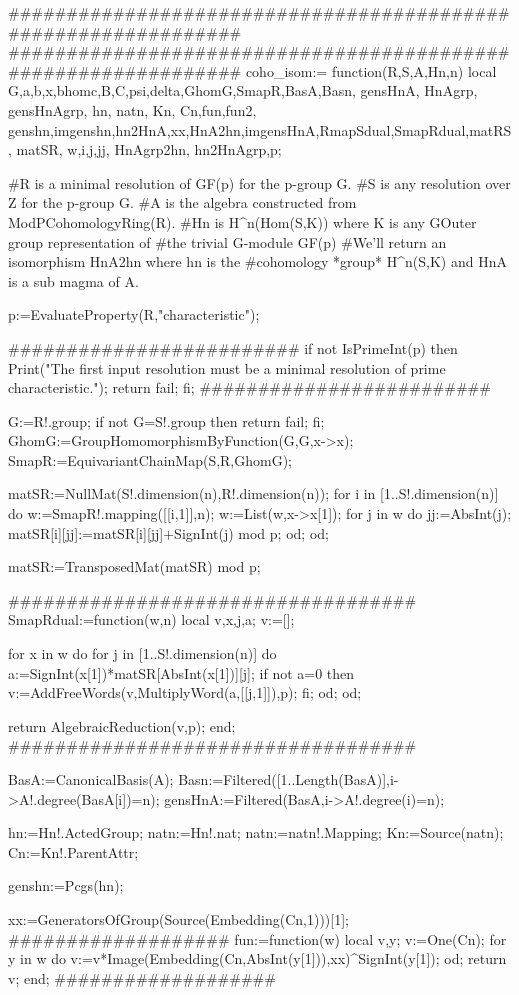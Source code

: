 ###############################################################
###############################################################
coho_isom:=
function(R,S,A,Hn,n)
local G,a,b,x,bhomc,B,C,psi,delta,GhomG,SmapR,BasA,Basn,
      gensHnA, HnAgrp, gensHnAgrp, hn, natn, Kn, Cn,fun,fun2,
      genshn,imgenshn,hn2HnA,xx,HnA2hn,imgensHnA,RmapSdual,SmapRdual,matRS,
      matSR, w,i,j,jj, HnAgrp2hn, hn2HnAgrp,p;

#R is a minimal resolution of GF(p) for the p-group G.
#S is any resolution over Z for the p-group G.
#A is the algebra constructed from ModPCohomologyRing(R).
#Hn is H^n(Hom(S,K)) where K is any GOuter group representation of
#the trivial G-module GF(p)
#We'll return an  isomorphism HnA2hn where hn is the
#cohomology *group* H^n(S,K) and HnA is a sub magma of A. 

p:=EvaluateProperty(R,"characteristic");

#########################
if not IsPrimeInt(p) then 
Print("The first input resolution must be a minimal resolution of prime characteristic.\n");
return fail;
fi;
#########################

G:=R!.group;
if not G=S!.group then return fail; fi;
GhomG:=GroupHomomorphismByFunction(G,G,x->x);
SmapR:=EquivariantChainMap(S,R,GhomG);

matSR:=NullMat(S!.dimension(n),R!.dimension(n));
for i in [1..S!.dimension(n)] do
w:=SmapR!.mapping([[i,1]],n);
w:=List(w,x->x[1]);
for j in w do
jj:=AbsInt(j);
matSR[i][jj]:=matSR[i][jj]+SignInt(j) mod p;
od;
od;

matSR:=TransposedMat(matSR) mod p;

###################################
SmapRdual:=function(w,n)
local v,x,j,a;
v:=[];

for x in w do
for j in [1..S!.dimension(n)] do
a:=SignInt(x[1])*matSR[AbsInt(x[1])][j];
if not a=0 then 
v:=AddFreeWords(v,MultiplyWord(a,[[j,1]]),p); fi;
od;
od;

return AlgebraicReduction(v,p);
end;
###################################


BasA:=CanonicalBasis(A);
Basn:=Filtered([1..Length(BasA)],i->A!.degree(BasA[i])=n);
gensHnA:=Filtered(BasA,i->A!.degree(i)=n);

hn:=Hn!.ActedGroup;
natn:=Hn!.nat; natn:=natn!.Mapping;
Kn:=Source(natn);
Cn:=Kn!.ParentAttr;

genshn:=Pcgs(hn);

xx:=GeneratorsOfGroup(Source(Embedding(Cn,1)))[1];
###################
fun:=function(w)
local v,y;
v:=One(Cn);
for y in w do
v:=v*Image(Embedding(Cn,AbsInt(y[1])),xx)^SignInt(y[1]);
od;
return v;
end;
###################

